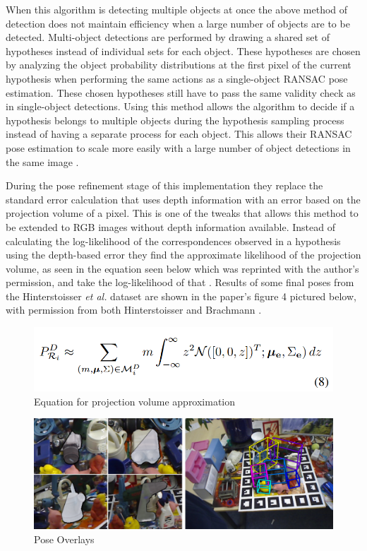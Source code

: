 \documentclass[12pt]{article}
\begin{document}
When this algorithm is detecting multiple objects at once the above
method of detection does not maintain efficiency when a large number of
objects are to be detected. Multi-object detections are performed by
drawing a shared set of hypotheses instead of individual sets for each
object. These hypotheses are chosen by analyzing the object probability
distributions at the first pixel of the current hypothesis when
performing the same actions as a single-object RANSAC pose estimation.
These chosen hypotheses still have to pass the same validity check as in
single-object detections. Using this method allows the algorithm to
decide if a hypothesis belongs to multiple objects during the hypothesis
sampling process instead of having a separate process for each object.
This allows their RANSAC pose estimation to scale more easily with a
large number of object detections in the same image
\autocite{brachmann}.

During the pose refinement stage of this implementation they replace the
standard error calculation that uses depth information with an error
based on the projection volume of a pixel. This is one of the tweaks
that allows this method to be extended to RGB images without depth
information available. Instead of calculating the log-likelihood of the
correspondences observed in a hypothesis using the depth-based error
they find the approximate likelihood of the projection volume, as seen
in the equation seen below which was reprinted with the author's
permission, and take the log-likelihood of that \autocite{brachmann}.
Results of some final poses from the Hinterstoisser \emph{et al.}
dataset are shown in the paper's figure 4 pictured below, with
permission from both Hinterstoisser and Brachmann
\autocites{brachmann}{hinterstoisser}.

\begin{figure}
\centering
\includegraphics{Pictures/eq8.png}
\caption{Equation for projection volume approximation}
\end{figure}

\begin{figure}
\centering
\includegraphics{Pictures/figure4.png}
\caption{Pose Overlays}
\end{figure}
\end{document}
